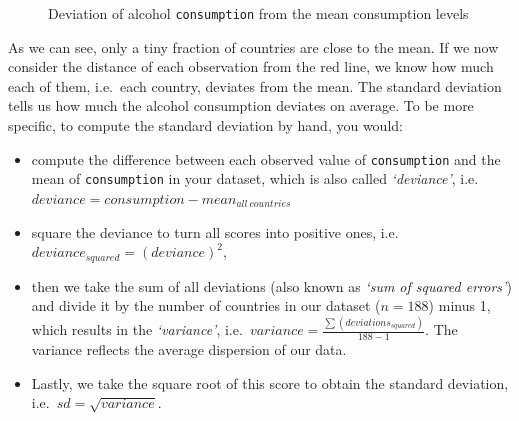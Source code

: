 \documentclass[
  letterpaper,
  DIV=11,
  numbers=noendperiod]{scrreprt}
\begin{document}
\begin{figure}


\caption{\label{fig-alcohol-consumption-deviation}Deviation of alcohol
\texttt{consumption} from the mean consumption levels}

\end{figure}%

As we can see, only a tiny fraction of countries are close to the mean.
If we now consider the distance of each observation from the red line,
we know how much each of them, i.e.~each country, deviates from the
mean. The standard deviation tells us how much the alcohol consumption
deviates on average. To be more specific, to compute the standard
deviation by hand, you would:

\begin{itemize}
\item
  compute the difference between each observed value of
  \texttt{consumption} and the mean of \texttt{consumption} in your
  dataset, which is also called \emph{`deviance'},
  i.e.~\(deviance = consumption - mean_{all\ countries}\)
\item
  square the deviance to turn all scores into positive ones,
  i.e.~\(deviance_{squared} = (deviance)^2\),
\item
  then we take the sum of all deviations (also known as \emph{`sum of
  squared errors'}) and divide it by the number of countries in our
  dataset (\(n = 188\)) minus 1, which results in the \emph{`variance'},
  i.e.~\(variance = \frac{\sum(deviations_{squared})}{188-1}\). The
  variance reflects the average dispersion of our data.
\item
  Lastly, we take the square root of this score to obtain the standard
  deviation, i.e.~\(sd = \sqrt{variance}\).
\end{itemize}
\end{document}

